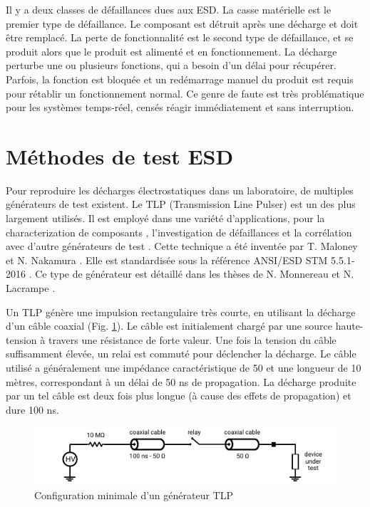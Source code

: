 Il y a deux classes de défaillances dues aux ESD.
La casse matérielle est le premier type de défaillance.
Le composant est détruit après une décharge et doit être remplacé.
La perte de fonctionnalité est le second type de défaillance, et se produit alors que le produit est alimenté et en fonctionnement.
La décharge perturbe une ou plusieurs fonctions, qui a besoin d'un délai pour récupérer.
Parfois, la fonction est bloquée et un redémarrage manuel du produit est requis pour rétablir un fonctionnement normal.
Ce genre de faute est très problématique pour les systèmes temps-réel, censés réagir immédiatement et sans interruption.

\section{Méthodes de test ESD}

Pour reproduire les décharges électrostatiques dans un laboratoire, de multiples générateurs de test existent.
Le TLP (Transmission Line Pulser) est un des plus largement utilisés.
Il est employé dans une variété d'applications, pour la characterization de composants \cite{TLPforESDProtectionCz, TLPthroubleshooting}, l'investigation de défaillances \cite{tlp-application-1, tlp-application-2} et la corrélation avec d'autre générateurs de test \cite{correlation-system-level-esd-tlp}.
Cette technique a été inventée par T. Maloney et N. Nakamura \cite{TLP}.
Elle est standardisée sous la référence ANSI/ESD STM 5.5.1-2016 \cite{tlp-standard}.
Ce type de générateur est détaillé dans les thèses de N. Monnereau \cite{phd-monnereau} et N. Lacrampe \cite{phd-lacrampe}.

Un TLP génère une impulsion rectangulaire très courte, en utilisant la décharge d'un câble coaxial (Fig. \ref{tlp_concept}).
Le câble est initialement chargé par une source haute-tension à travers une résistance de forte valeur.
Une fois la tension du câble suffisamment élevée, un relai est commuté pour déclencher la décharge.
Le câble utilisé a généralement une impédance caractéristique de 50\textOmega{} et une longueur de 10 mètres, correspondant à un délai de 50 ns de propagation.
La décharge produite par un tel câble est deux fois plus longue (à cause des effets de propagation) et dure 100 ns.

\begin{figure}[!h]
  \centering
  \includegraphics[width=\textwidth]{src/1/figures/tlp_concept.pdf}
  \caption{Configuration minimale d'un générateur TLP}
  \label{tlp_concept}
\end{figure}

